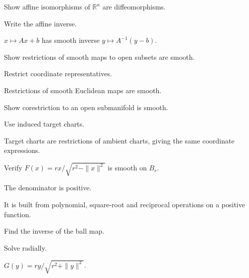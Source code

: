 \begin{exercise}\label{exr:vii03-11}
Show affine isomorphisms of \(\mathbb R^n\) are diffeomorphisms.
\end{exercise}
\begin{hint}
Write the affine inverse.
\end{hint}
\begin{solution}
\(x\mapsto Ax+b\) has smooth inverse \(y\mapsto A^{-1}(y-b)\).
\end{solution}

\begin{exercise}\label{exr:vii03-12}
Show restrictions of smooth maps to open subsets are smooth.
\end{exercise}
\begin{hint}
Restrict coordinate representatives.
\end{hint}
\begin{solution}
Restrictions of smooth Euclidean maps are smooth.
\end{solution}

\begin{exercise}\label{exr:vii03-13}
Show corestriction to an open submanifold is smooth.
\end{exercise}
\begin{hint}
Use induced target charts.
\end{hint}
\begin{solution}
Target charts are restrictions of ambient charts, giving the same coordinate expressions.
\end{solution}

\begin{exercise}\label{exr:vii03-14}
Verify \(F(x)=rx/\sqrt{r^2-\|x\|^2}\) is smooth on \(B_r\).
\end{exercise}
\begin{hint}
The denominator is positive.
\end{hint}
\begin{solution}
It is built from polynomial, square-root and reciprocal operations on a positive function.
\end{solution}

\begin{exercise}\label{exr:vii03-15}
Find the inverse of the ball map.
\end{exercise}
\begin{hint}
Solve radially.
\end{hint}
\begin{solution}
\(G(y)=ry/\sqrt{r^2+\|y\|^2}\).
\end{solution}

